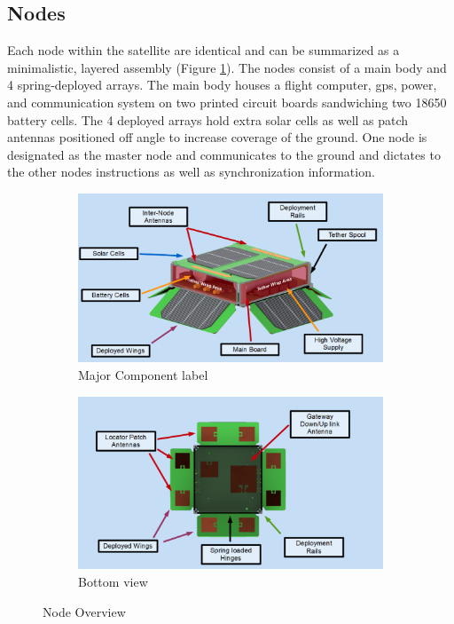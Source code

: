 \documentclass{article}
\begin{document}
\subsection{Nodes}
Each node within the satellite are identical and can be summarized as a minimalistic, layered assembly (Figure \ref{fig:node_asm}). The nodes consist of a main body and 4 spring-deployed arrays. The main body houses a flight computer, gps, power, and communication system on two printed circuit boards sandwiching two 18650 battery cells. The 4 deployed arrays hold extra solar cells as well as patch antennas positioned off angle to increase coverage of the ground. One node is designated as the master node and communicates to the ground and dictates to the other nodes instructions as well as synchronization information.

\begin{figure}[H]
  \centering
  \begin{subfigure}[b]{0.7\linewidth}
    \includegraphics[width=\linewidth]{figures/Labeled_ISO}
    \caption{Major Component label}
  \end{subfigure}
  \begin{subfigure}[b]{0.7\linewidth}
    \includegraphics[width=\linewidth]{figures/Labeled_BOT}
    \caption{Bottom view}
  \end{subfigure}
  \caption{Node Overview}
  \label{fig:node_asm}
\end{figure}
\end{document}
